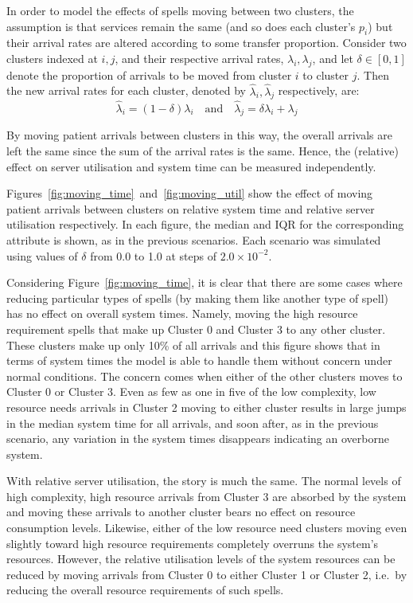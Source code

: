 \documentclass[11pt]{article}
\begin{document}
In order to model the effects of spells moving between two clusters, the
assumption is that services remain the same (and so does each cluster's \(p_i\))
but their arrival rates are altered according to some transfer proportion.
Consider two clusters indexed at \(i, j\), and their respective arrival rates,
\(\lambda_i, \lambda_j\), and let \(\delta \in [0, 1]\) denote the proportion of
arrivals to be moved from cluster \(i\) to cluster \(j\). Then the new arrival
rates for each cluster, denoted by \(\hat\lambda_i, \hat\lambda_j\)
respectively, are:
\begin{equation}\label{eq:moving}
    \hat\lambda_i = \left(1 - \delta\right) \lambda_i
    \quad \text{and} \quad
    \hat\lambda_j = \delta\lambda_i + \lambda_j
\end{equation}

By moving patient arrivals between clusters in this way, the overall arrivals
are left the same since the sum of the arrival rates is the same. Hence, the
(relative) effect on server utilisation and system time can be measured
independently.

Figures~\ref{fig:moving_time}~and~\ref{fig:moving_util} show the effect of
moving patient arrivals between clusters on relative system time and relative
server utilisation respectively. In each figure, the median and IQR for the
corresponding attribute is shown, as in the previous scenarios. Each scenario
was simulated using values of \(\delta\) from 0.0 to 1.0 at steps of \(2.0
\times 10^{-2}\).

Considering Figure~\ref{fig:moving_time}, it is clear that there are some cases
where reducing particular types of spells (by making them like another type of
spell) has no effect on overall system times. Namely, moving the high
resource requirement spells that make up Cluster 0 and Cluster 3 to any other
cluster. These clusters make up only 10\% of all arrivals and this figure shows
that in terms of system times the model is able to handle them without concern
under normal conditions. The concern comes when either of the other clusters
moves to Cluster 0 or Cluster 3. Even as few as one in five of the low
complexity, low resource needs arrivals in Cluster 2 moving to either cluster
results in large jumps in the median system time for all arrivals, and soon
after, as in the previous scenario, any variation in the system times
disappears indicating an overborne system.

With relative server utilisation, the story is much the same. The normal levels
of high complexity, high resource arrivals from Cluster 3 are absorbed by the
system and moving these arrivals to another cluster bears no effect on resource
consumption levels. Likewise, either of the low resource need clusters moving
even slightly toward high resource requirements completely overruns the system's
resources. However, the relative utilisation levels of the system resources can
be reduced by moving arrivals from Cluster 0 to either Cluster 1 or Cluster 2,
i.e.\ by reducing the overall resource requirements of such spells.
\end{document}
